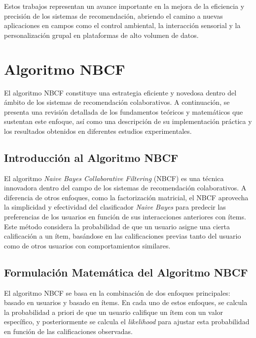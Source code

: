 \documentclass[runningheads,a4paper]{llncs}
\begin{document}
Estos trabajos representan un avance importante 
en la mejora de la eficiencia y precisión de los 
sistemas de recomendación, abriendo el camino a 
nuevas aplicaciones en campos como el control 
ambiental, la interacción sensorial y la 
personalización grupal en plataformas de alto 
volumen de datos.


\section{Algoritmo NBCF}

El algoritmo NBCF constituye una estrategia eficiente 
y novedosa dentro del ámbito de los sistemas de 
recomendación colaborativos. A continuación, se 
presenta una revisión detallada de los fundamentos 
teóricos y matemáticos que sustentan este enfoque, 
así como una descripción de su implementación práctica 
y los resultados obtenidos en diferentes estudios 
experimentales.

\subsection{Introducción al Algoritmo NBCF}

El algoritmo \textit{Naive Bayes Collaborative 
Filtering} (NBCF) es una técnica innovadora dentro 
del campo de los sistemas de recomendación 
colaborativos. A diferencia de otros enfoques, 
como la factorización matricial, el NBCF aprovecha la 
simplicidad y efectividad del clasificador \textit{Naive Bayes} 
para predecir las preferencias de los usuarios en 
función de sus interacciones anteriores con ítems. 
Este método considera la probabilidad de que un 
usuario asigne una cierta calificación a un ítem, 
basándose en las calificaciones previas tanto del 
usuario como de otros usuarios con comportamientos 
similares.

\subsection{Formulación Matemática del Algoritmo NBCF}

El algoritmo NBCF se basa en la combinación de dos 
enfoques principales: basado en usuarios y basado 
en ítems. En cada uno de estos enfoques, se calcula la 
probabilidad a priori de que un usuario califique un 
ítem con un valor específico, y posteriormente se 
calcula el \textit{likelihood} para ajustar esta 
probabilidad en función de las calificaciones 
observadas.
\end{document}
